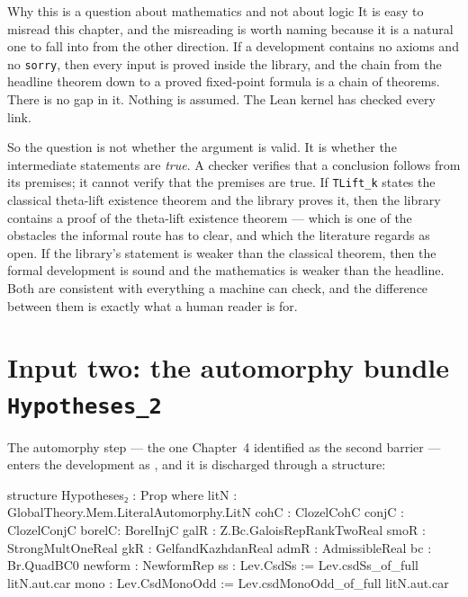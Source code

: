 \begin{seamnote}{Why this is a question about mathematics and not about logic}
It is easy to misread this chapter, and the misreading is worth naming
because it is a natural one to fall into from the other direction. If a
development contains no axioms and no \texttt{sorry}, then every input is
proved inside the library, and the chain from the headline theorem down to a
proved fixed-point formula is a chain of theorems. There is no gap in it.
Nothing is assumed. The Lean kernel has checked every link.

So the question is not whether the argument is valid. It is whether the
intermediate statements are \emph{true}. A checker verifies that a conclusion
follows from its premises; it cannot verify that the premises are true. If
\texttt{TLift\_k} states the classical theta-lift existence theorem and the
library proves it, then the library contains a proof of the theta-lift
existence theorem --- which is one of the obstacles the informal route has to
clear, and which the literature regards as open. If the library's statement is
weaker than the classical theorem, then the formal development is sound and
the mathematics is weaker than the headline. Both are consistent with
everything a machine can check, and the difference between them is exactly
what a human reader is for.
\end{seamnote}

\section{Input two: the automorphy bundle \texttt{Hypotheses\_2}}The automorphy step --- the one Chapter~4 identified as the second barrier ---
enters the development as , and it is
discharged through a structure:

\begin{seamnote}{}
\begin{leanquote}
structure Hypotheses₂ : Prop where
  litN  : GlobalTheory.Mem.LiteralAutomorphy.LitN
  cohC  : ClozelCohC
  conjC : ClozelConjC
  borelC: BorelInjC
  galR  : Z.Bc.GaloisRepRankTwoReal
  smoR  : StrongMultOneReal
  gkR   : GelfandKazhdanReal
  admR  : AdmissibleReal
  bc    : Br.QuadBC0
  newform : NewformRep
  ss    : Lev.CsdSs := Lev.csdSs_of_full litN.aut.car
  mono  : Lev.CsdMonoOdd := Lev.csdMonoOdd_of_full litN.aut.car
\end{leanquote}
\end{seamnote}

